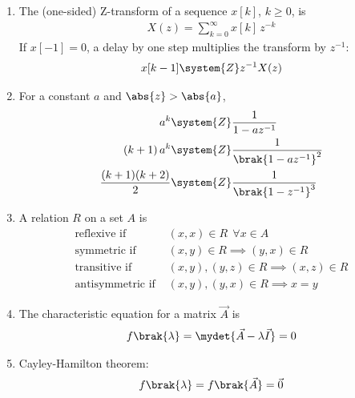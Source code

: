 \begin{enumerate}[label=\thesubsection.\arabic*, ref=\thesubsection.\theenumi]
\item The (one-sided) Z-transform of a sequence $x[k]$, $k \ge 0$, is
\begin{align}
X(z) = \sum_{k=0}^{\infty} x[k]\, z^{-k}
\label{eq:zseq-def}
\end{align}
If $x[-1] = 0$, a delay by one step multiplies the transform by $z^{-1}$:
\begin{align}
x[k-1] \system{Z} z^{-1} X(z)
\label{eq:zseq-shift}
\end{align}

\item For a constant $a$ and $\abs{z} > \abs{a}$,
\begin{align}
a^{k} &\system{Z} \frac{1}{1 - a z^{-1}}
\label{eq:zseq-geo} \\
(k+1)\, a^{k} &\system{Z} \frac{1}{\brak{1 - a z^{-1}}^{2}}
\label{eq:zseq-geo2} \\
\frac{(k+1)(k+2)}{2} &\system{Z} \frac{1}{\brak{1 - z^{-1}}^{3}}
\label{eq:zseq-geo3}
\end{align}

\item A relation $R$ on a set $A$ is
\begin{align}
\text{reflexive if } & (x, x) \in R \ \ \forall x \in A
\label{eq:rel-ref} \\
\text{symmetric if } & (x, y) \in R \implies (y, x) \in R
\label{eq:rel-sym} \\
\text{transitive if } & (x, y), (y, z) \in R \implies (x, z) \in R
\label{eq:rel-trans} \\
\text{antisymmetric if } & (x, y), (y, x) \in R \implies x = y
\label{eq:rel-anti}
\end{align}

\item The characteristic equation for a matrix $\vec{A}$ is
\begin{align}
f\brak{\lambda} = \mydet{\vec{A} - \lambda\vec{I}} = 0
\label{eq:chareq}
\end{align}

\item Cayley-Hamilton theorem:
\begin{align}
f\brak{\lambda} = f\brak{\vec{A}} = \vec{0}
\label{eq:cayley}
\end{align}


\end{enumerate}
